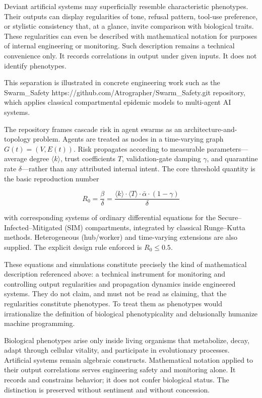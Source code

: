 Deviant artificial systems may superficially resemble characteristic phenotypes. Their outputs can display regularities of tone, refusal pattern, tool-use preference, or stylistic consistency that, at a glance, invite comparison with biological traits. These regularities can even be described with mathematical notation for purposes of internal engineering or monitoring. Such description remains a technical convenience only. It records correlations in output under given inputs. It does not identify phenotypes.

This separation is illustrated in concrete engineering work such as the Swarm_Safety https://github.com/Atrographer/Swarm_Safety.git repository, which applies classical compartmental epidemic models to multi-agent AI systems.

The repository frames cascade risk in agent swarms as an architecture-and-topology problem. Agents are treated as nodes in a time-varying graph \(G(t) = (V, E(t))\). Risk propagates according to measurable parameters—average degree \(\langle k \rangle\), trust coefficients \(T\), validation-gate damping \(\gamma\), and quarantine rate \(\delta\)—rather than any attributed internal intent. The core threshold quantity is the basic reproduction number

\[
R_0 = \frac{\beta}{\delta} = \frac{\langle k \rangle \cdot \langle T \rangle \cdot \bar{\alpha} \cdot (1 - \gamma)}{\delta}
\]

with corresponding systems of ordinary differential equations for the Secure–Infected–Mitigated (SIM) compartments, integrated by classical Runge–Kutta methods. Heterogeneous (hub/worker) and time-varying extensions are also supplied. The explicit design rule enforced is \(R_0 \le 0.5\).

These equations and simulations constitute precisely the kind of mathematical description referenced above: a technical instrument for monitoring and controlling output regularities and propagation dynamics inside engineered systems. They do not claim, and must not be read as claiming, that the regularities constitute phenotypes. To treat them as phenotypes would irrationalize the definition of biological phenotypicality and delusionally humanize machine programming.

Biological phenotypes arise only inside living organisms that metabolize, decay, adapt through cellular vitality, and participate in evolutionary processes. Artificial systems remain algebraic constructs. Mathematical notation applied to their output correlations serves engineering safety and monitoring alone. It records and constrains behavior; it does not confer biological status. The distinction is preserved without sentiment and without concession.


